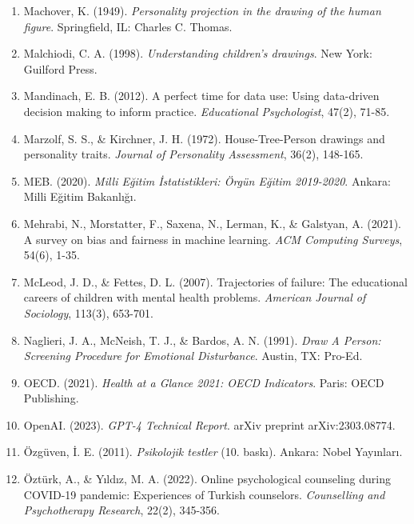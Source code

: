 \begin{enumerate}
\item Machover, K. (1949). \textit{Personality projection in the drawing of the human figure}. Springfield, IL: Charles C. Thomas.

\item Malchiodi, C. A. (1998). \textit{Understanding children's drawings}. New York: Guilford Press.

\item Mandinach, E. B. (2012). A perfect time for data use: Using data-driven decision making to inform practice. \textit{Educational Psychologist}, 47(2), 71-85.

\item Marzolf, S. S., \& Kirchner, J. H. (1972). House-Tree-Person drawings and personality traits. \textit{Journal of Personality Assessment}, 36(2), 148-165.

\item MEB. (2020). \textit{Milli Eğitim İstatistikleri: Örgün Eğitim 2019-2020}. Ankara: Milli Eğitim Bakanlığı.

\item Mehrabi, N., Morstatter, F., Saxena, N., Lerman, K., \& Galstyan, A. (2021). A survey on bias and fairness in machine learning. \textit{ACM Computing Surveys}, 54(6), 1-35.

\item McLeod, J. D., \& Fettes, D. L. (2007). Trajectories of failure: The educational careers of children with mental health problems. \textit{American Journal of Sociology}, 113(3), 653-701.

\item Naglieri, J. A., McNeish, T. J., \& Bardos, A. N. (1991). \textit{Draw A Person: Screening Procedure for Emotional Disturbance}. Austin, TX: Pro-Ed.

\item OECD. (2021). \textit{Health at a Glance 2021: OECD Indicators}. Paris: OECD Publishing.

\item OpenAI. (2023). \textit{GPT-4 Technical Report}. arXiv preprint arXiv:2303.08774.

\item Özgüven, İ. E. (2011). \textit{Psikolojik testler} (10. baskı). Ankara: Nobel Yayınları.

\item Öztürk, A., \& Yıldız, M. A. (2022). Online psychological counseling during COVID-19 pandemic: Experiences of Turkish counselors. \textit{Counselling and Psychotherapy Research}, 22(2), 345-356.


\end{enumerate}
